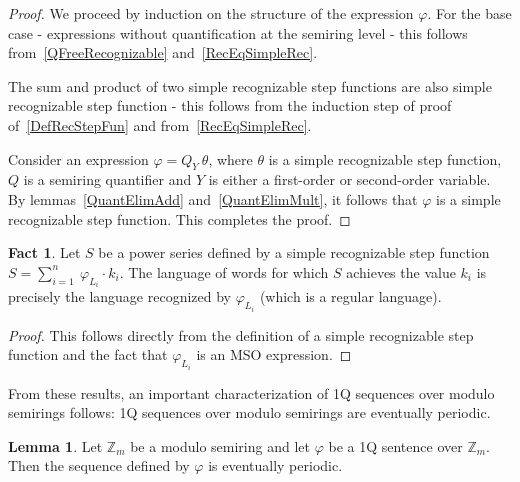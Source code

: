 \documentclass[12pt]{article}
\theoremstyle{definition}
\newtheorem{fact}{Fact}[section]
\newtheorem{lemma}[theorem]{Lemma}
\begin{document}
\begin{proof}
    We proceed by induction on the structure of the expression $\varphi$. For the base case - expressions without quantification at the semiring level - this follows from~\cref{QFreeRecognizable} and~\cref{RecEqSimpleRec}. 
    
    The sum and product of two simple recognizable step functions are also simple recognizable step function - this follows from the induction step of proof of~\cref{DefRecStepFun} and from~\cref{RecEqSimpleRec}.

    Consider an expression $\varphi = Q_Y \ \theta$, where $\theta$ is a simple recognizable step function, $Q$ is a semiring quantifier and $Y$ is either a first-order or second-order variable. By lemmas~\ref{QuantElimAdd} and~\ref{QuantElimMult}, it follows that $\varphi$ is a simple recognizable step function. This completes the proof.
\end{proof}

\begin{fact}
    \label{InvAreReg}
    Let $S$ be a power series defined by a simple recognizable step function $S = \sum_{i = 1}^{n} \ \varphi_{L_i} \cdot k_i$. The language of words for which $S$ achieves the value $k_i$ is precisely the language recognized by $\varphi_{L_i}$ (which is a regular language).
\end{fact}

\begin{proof}
    This follows directly from the definition of a simple recognizable step function and the fact that $\varphi_{L_i}$ is an MSO expression.
\end{proof}

From these results, an important characterization of 1Q sequences over modulo semirings follows: 1Q sequences over modulo semirings are eventually periodic.

\begin{lemma}
    \label{OverModAreSimpleRec2}
    Let $\mathbb{Z}_m$ be a modulo semiring and let $\varphi$ be a 1Q sentence over $\mathbb{Z}_m$. Then the sequence defined by $\varphi$ is eventually periodic.
\end{lemma}
\end{document}
